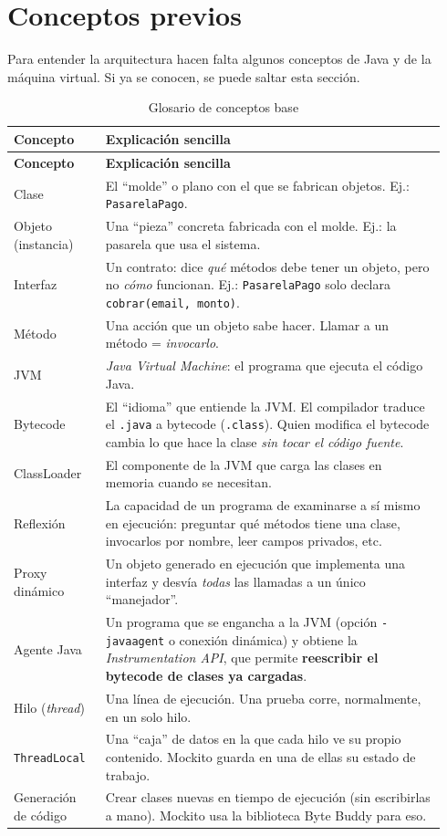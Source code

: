 \documentclass[11pt,a4paper,oneside]{report}
\newcommand{\code}[1]{\texttt{#1}}
\begin{document}
\section{Conceptos previos}
Para entender la arquitectura hacen falta algunos conceptos de Java y de la máquina virtual. Si ya se conocen, se puede saltar esta sección.

\begin{longtable}{p{0.2\linewidth}p{0.74\linewidth}}
\caption{Glosario de conceptos base}\\
\toprule
\textbf{Concepto} & \textbf{Explicación sencilla}\\
\midrule
\endfirsthead
\toprule
\textbf{Concepto} & \textbf{Explicación sencilla}\\
\midrule
\endhead
Clase & El ``molde'' o plano con el que se fabrican objetos. Ej.: \code{PasarelaPago}.\\
Objeto (instancia) & Una ``pieza'' concreta fabricada con el molde. Ej.: la pasarela que usa el sistema.\\
Interfaz & Un contrato: dice \emph{qué} métodos debe tener un objeto, pero no \emph{cómo} funcionan. Ej.: \code{PasarelaPago} solo declara \code{cobrar(email, monto)}.\\
Método & Una acción que un objeto sabe hacer. Llamar a un método = \emph{invocarlo}.\\
JVM & \emph{Java Virtual Machine}: el programa que ejecuta el código Java.\\
Bytecode & El ``idioma'' que entiende la JVM. El compilador traduce el \code{.java} a bytecode (\code{.class}). Quien modifica el bytecode cambia lo que hace la clase \emph{sin tocar el código fuente}.\\
ClassLoader & El componente de la JVM que carga las clases en memoria cuando se necesitan.\\
Reflexión & La capacidad de un programa de examinarse a sí mismo en ejecución: preguntar qué métodos tiene una clase, invocarlos por nombre, leer campos privados, etc.\\
Proxy dinámico & Un objeto generado en ejecución que implementa una interfaz y desvía \emph{todas} las llamadas a un único ``manejador''.\\
Agente Java & Un programa que se engancha a la JVM (opción \code{-javaagent} o conexión dinámica) y obtiene la \emph{Instrumentation API}, que permite \textbf{reescribir el bytecode de clases ya cargadas}.\\
Hilo (\emph{thread}) & Una línea de ejecución. Una prueba corre, normalmente, en un solo hilo.\\
\code{ThreadLocal} & Una ``caja'' de datos en la que cada hilo ve su propio contenido. Mockito guarda en una de ellas su estado de trabajo.\\
Generación de código & Crear clases nuevas en tiempo de ejecución (sin escribirlas a mano). Mockito usa la biblioteca Byte Buddy para eso.\\
\bottomrule
\end{longtable}
\end{document}
